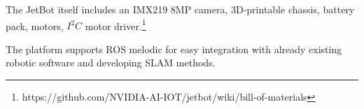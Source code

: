 \documentclass[class=article, crop=false]{standalone}
\begin{document}
The JetBot itself includes an IMX219 8MP camera, 3D-printable chassis, battery pack, motors, $ I^2C $ motor driver.\footnote{https://github.com/NVIDIA-AI-IOT/jetbot/wiki/bill-of-materials}

The platform supports ROS melodic for easy integration with already existing robotic software and developing SLAM methods.

\end{document}
